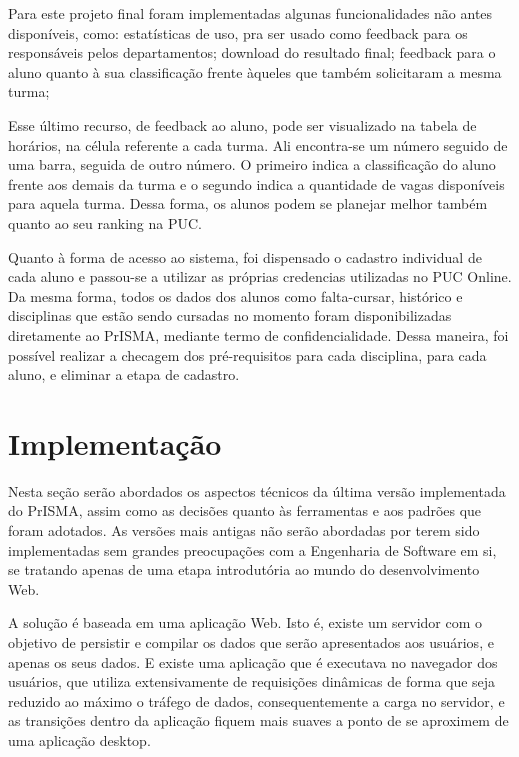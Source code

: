 \documentclass[graduacao,brazil]{ThesisPUC}
\begin{document}
Para este projeto final foram implementadas algunas funcionalidades não antes disponíveis, como: estatísticas de uso, pra ser usado como feedback para os responsáveis pelos departamentos; download do resultado final; feedback para o aluno quanto à sua classificação frente àqueles que também solicitaram a mesma turma;

Esse último recurso, de feedback ao aluno, pode ser visualizado na tabela de horários, na célula referente a cada turma. Ali encontra-se um número seguido de uma barra, seguida de outro número. O primeiro indica a classificação do aluno frente aos demais da turma e o segundo indica a quantidade de vagas disponíveis para aquela turma. Dessa forma, os alunos podem se planejar melhor também quanto ao seu ranking na PUC.

Quanto à forma de acesso ao sistema, foi dispensado o cadastro individual de cada aluno e passou-se a utilizar as próprias credencias utilizadas no PUC Online. Da mesma forma, todos os dados dos alunos como falta-cursar, histórico e disciplinas que estão sendo cursadas no momento foram disponibilizadas diretamente ao PrISMA, mediante termo de confidencialidade. Dessa maneira, foi possível realizar a checagem dos pré-requisitos para cada disciplina, para cada aluno, e eliminar a etapa de cadastro.



\chapter{Implementação}

Nesta seção serão abordados os aspectos técnicos da última versão implementada do PrISMA, assim como as decisões quanto às ferramentas e aos padrões que foram adotados. As versões mais antigas não serão abordadas por terem sido implementadas sem grandes preocupações com a Engenharia de Software em si, se tratando apenas de uma etapa introdutória ao mundo do desenvolvimento Web.

A solução é baseada em uma aplicação Web. Isto é, existe um servidor com o objetivo de persistir e compilar os dados que serão apresentados aos usuários, e apenas os seus dados. E existe uma aplicação que é executava no navegador dos usuários, que utiliza extensivamente de requisições dinâmicas de forma que seja reduzido ao máximo o tráfego de dados, consequentemente a carga no servidor, e as transições dentro da aplicação fiquem mais suaves a ponto de se aproximem de uma aplicação desktop.
\end{document}
